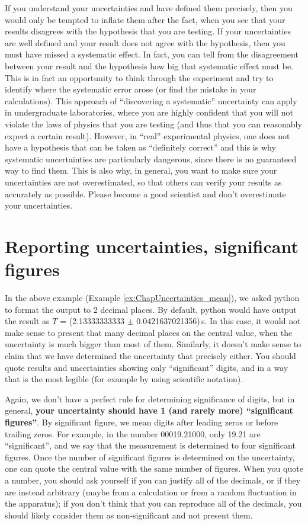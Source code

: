 If you understand your uncertainties and have defined them precisely, then you would only be tempted to inflate them after the fact, when you see that your results disagrees with the hypothesis that you are testing. If your uncertainties are well defined and your result does not agree with the hypothesis, then you must have missed a systematic effect. In fact, you can tell from the disagreement between your result and the hypothesis how big that systematic effect must be. This is in fact an opportunity to think through the experiment and try to identify where the systematic error arose (or find the mistake in your calculations). This approach of ``discovering a systematic'' uncertainty can apply in undergraduate laboratories, where you are highly confident that you will not violate the laws of physics that you are testing (and thus that you can reasonably expect a certain result). However, in ``real'' experimental physics, one does not have a hypothesis that can be taken as ``definitely correct'' and this is why systematic uncertainties are particularly dangerous, since there is no guaranteed way to find them. This is also why, in general, you want to make sure your uncertainties are not overestimated, so that others can verify your results as accurately as possible. Please become a good scientist and don't overestimate your uncertainties.


\section{Reporting uncertainties, significant figures}
In the above example (Example \ref{ex:ChapUncertainties_mean}), we asked python to format the output to 2 decimal places. By default, python would have output the result as $T$ = (2.13333333333 $\pm$ 0.0421637021356)\,s. In this case, it would not make sense to present that many decimal places on the central value, when the uncertainty is much bigger than most of them. Similarly, it doesn't make sense to claim that we have determined the uncertainty that precisely either. You should quote results and uncertainties showing only ``significant'' digits, and in a way that is the most legible (for example by using scientific notation).

Again, we don't have a perfect rule for determining significance of digits, but in general, \textbf{your uncertainty should have 1 (and rarely more) ``significant figures''}. By significant figure, we mean digits after leading zeros or before trailing zeros. For example, in the number 00019.21000, only 19.21 are ``significant'', and we say that the measurement is determined to four significant figures. Once the number of significant figures is determined on the uncertainty, one can quote the central value with the same number of figures. When you quote a number, you should ask yourself if you can justify all of the decimals, or if they are instead arbitrary (maybe from a calculation or from a random fluctuation in the apparatus); if you don't think that you can reproduce all of the decimals, you should likely consider them as non-significant and not present them.

